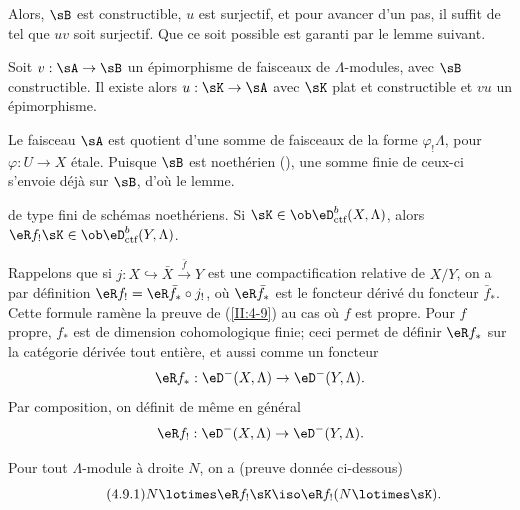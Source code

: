 Alors, $\sB$ est constructible, $u$ est surjectif, et pour avancer d'un pas, il 
suffit de  tel que
$u v$ soit surjectif. Que ce soit possible est garanti par le lemme suivant. 





\begin{lemma_}\label{II:4-8}
Soit $v:\sA\to \sB$ un épimorphisme de faisceaux de $\Lambda$-modules, avec 
$\sB$ constructible. Il existe alors $u:\sK\to \sA$ avec $\sK$ plat et 
constructible et $v u$ un épimorphisme. 
\end{lemma_}

Le faisceau $\sA$ est quotient d'une somme de faisceaux de la forme 
$\varphi_! \Lambda$, pour $\varphi:U\to X$ étale. Puisque $\sB$ est noethérien 
(\cite[IX.2.10]{sga4}), une somme finie de ceux-ci s'envoie déjà sur $\sB$, 
d'où le lemme. 





\begin{theorem_}\label{II:4-9}
 de type fini de schémas noethériens. 
Si $\sK\in\ob\eD_\textnormal{ctf}^b(X,\Lambda)$, alors 
$\eR f_!\sK\in \ob\eD_\textnormal{ctf}^b(Y,\Lambda)$. 
\end{theorem_}

Rappelons que si $j:X\hookrightarrow \bar X \xrightarrow{\bar f} Y$ est une 
compactification relative de $X/Y$, on a par définition 
$\eR f_! = \eR \bar f_* \circ j_!$, où $\eR \bar f_*$ est le foncteur dérivé 
du foncteur $\bar f_*$. Cette formule ramène la preuve de (\ref{II:4-9}) 
au cas où $f$ est propre. Pour $f$ propre, $f_*$ est de dimension 
cohomologique finie; ceci permet de définir $\eR f_*$ sur la catégorie 
dérivée tout entière, et aussi comme un foncteur 
\[
  \eR f_* : \eD^-(X,\Lambda) \to \eD^-(Y,\Lambda) \text{.}
\]
Par composition, on définit de même en général 
\[
  \eR f_! : \eD^-(X,\Lambda) \to \eD^-(Y,\Lambda) \text{.}
\]

Pour tout $\Lambda$-module à droite $N$, on a (preuve donnée ci-dessous) 
\begin{equation*}\tag{4.9.1}\label{II:eq:4-9-1}
  N\lotimes \eR f_! \sK \iso \eR f_! (N\lotimes \sK) \text{.}
\end{equation*}


